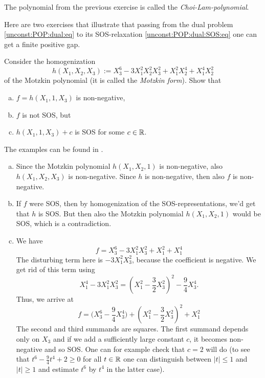The polynomial from the previous exercise is called the \emph{Choi-Lam-polynomial}. 

Here are two exercises that illustrate that passing from the dual problem \eqref{unconst:POP:dual:eq} to its SOS-relaxation \eqref{unconst:POP:dual:SOS:eq} one can get a finite positive gap. 

\begin{exercise}
	\label{parrilo:example}
	Consider the homogenization
	\[
	h(X_1,X_2,X_3) := X_3^6 -3 X_1^2 X_2^2 X_3^2 + X_1^2 X_2^4 + X_1^4 X_2^2
	\]
	of the Motzkin polynomial (it is called the \emph{Motzkin form}). Show that 
	\begin{enumerate}[(a)]
		\item $f = h(X_1,1,X_3)$ is non-negative, 
		\item $f$ is not SOS, but 
		\item $h(X_1,1,X_3) +c$ is SOS for some $c \in \mathbb{R}$. 
	\end{enumerate}
\end{exercise}
\begin{solution}
	The examples can be found in \cite[Example~7.2]{Parrilo:2003}.
	\begin{enumerate}[(a)]
	\item Since the Motzkin polynomial $h(X_1,X_2,1)$ is non-negative, also $h(X_1,X_2,X_3)$ is non-negative. Since $h$ is non-negative, then also $f$ is non-negative. 
	\item If $f$ were SOS, then by homogenization of the SOS-representations, we'd get that $h$ is SOS. But then also the Motzkin polynomial $h(X_1,X_2,1)$ would be SOS, which is a contradiction. 
	\item We have
	\[
		f=X_3^6 - 3 X_1^2 X_3^2 + X_1^2 + X_1^4 
	\]
	The disturbing term here is $- 3 X_1^2 X_3^2$, because the coefficient is negative. We get rid of this term using 
	\[
		X_1^4  - 3 X_1^2 X_3^2 = (X_1^2 - \frac{3}{2} X_3^2)^2 - \frac{9}{4} X_3^4.
	\]
	Thus, we arrive at
	\[
		f = \bigl(X_3^6 - \frac{9}{4} X_3^4 \bigr) + (X_1^2 - \frac{3}{2} X_3^2)^2 + X_1^2
	\]
	The second and third summands are squares. The first summand depends only on $X_3$ and if we add a sufficiently large constant $c$, it becomes non-negative and so SOS. One can for example check that $c=2$ will do (to see that $t^6 - \frac{9}{4} t^4 + 2 \ge 0$ for all $t \in \mathbb{R}$ one can distinguish between $|t| \le 1$ and $|t| \ge 1$ and estimate $t^6$ by $t^4$ in the latter case). 
	\end{enumerate}
\end{solution}

